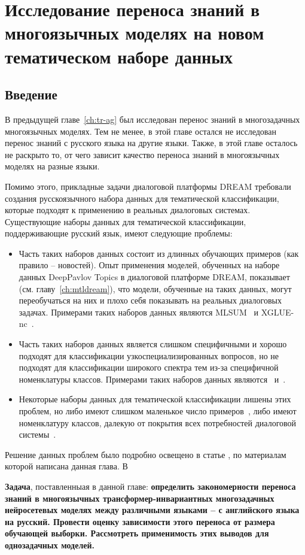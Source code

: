 \chapter{Исследование переноса знаний в многоязычных моделях на новом тематическом наборе данных}\label{ch:rutopics}
\section{Введение}
В предыдущей главе~\ref{ch:tr-ag} был исследован перенос знаний в многозадачных многоязычных моделях. Тем не менее, в этой главе остался не исследован перенос знаний с русского языка на другие языки. Также, в этой главе осталось не раскрыто то, от чего зависит качество переноса знаний в многоязычных моделях на разные языки.

Помимо этого, прикладные задачи диалоговой платформы {DREAM} требовали создания русскоязычного набора данных для тематической классификации, которые подходят к применению в реальных диалоговых системах. Существующие наборы данных для тематической классификации, поддерживающие русский язык, имеют следующие проблемы:
\begin{itemize}
   \item Часть таких наборов данных состоит из длинных обучающих примеров (как правило -- новостей). Опыт применения моделей, обученных на наборе данных {DeepPavlov Topics} в диалоговой платформе DREAM, показывает (см. главу~\ref{ch:mtldream}), что модели, обученные на таких данных, могут переобучаться на них и плохо себя показывать на реальных диалоговых задачах. Примерами таких наборов данных являются {MLSUM}~\cite{mlsum} и {XGLUE-nc}~\cite{xglue}.
   \item Часть таких наборов данных является слишком специфичными и хорошо подходят для классификации узкоспециализированных вопросов, но не подходят для классификации широкого спектра тем из-за специфичной номенклатуры классов.  Примерами таких наборов данных являются~\cite{healthcare_facilities_reviews} и~\cite{pstu}.
   \item Некоторые наборы данных для тематической классификации лишены этих проблем, но либо имеют слишком маленькое число примеров~\cite{chatbotru}, либо имеют номенклатуру классов, далекую от покрытия всех потребностей диалоговой системы~\cite{massive}.
\end{itemize}
Решение данных проблем было подробно освещено в статье \cite{rutopics}, по материалам которой написана данная глава. В

\textbf{Задача}, поставленныая в данной главе: \textbf{определить закономерности переноса знаний в многоязычных трансформер-инвариантных многозадачных нейросетевых моделях между различными языками -- с английского языка на русский. Провести оценку зависимости этого переноса от размера обучающей выборки. Рассмотреть применимость этих выводов для однозадачных моделей.}

